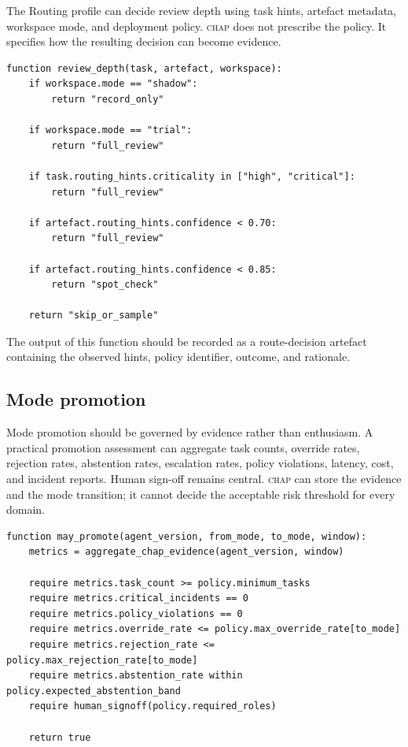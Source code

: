 \documentclass[11pt]{article}
\newcommand{\chap}{\textsc{chap}}
\begin{document}
The Routing profile can decide review depth using task hints, artefact metadata, workspace mode, and deployment policy. \chap{} does not prescribe the policy. It specifies how the resulting decision can become evidence.

\begin{lstlisting}[caption={Example review-depth policy, deployment-specific.},label={lst:reviewdepth}]
function review_depth(task, artefact, workspace):
    if workspace.mode == "shadow":
        return "record_only"

    if workspace.mode == "trial":
        return "full_review"

    if task.routing_hints.criticality in ["high", "critical"]:
        return "full_review"

    if artefact.routing_hints.confidence < 0.70:
        return "full_review"

    if artefact.routing_hints.confidence < 0.85:
        return "spot_check"

    return "skip_or_sample"
\end{lstlisting}

The output of this function should be recorded as a route-decision artefact containing the observed hints, policy identifier, outcome, and rationale.

\subsection{Mode promotion}

Mode promotion should be governed by evidence rather than enthusiasm. A practical promotion assessment can aggregate task counts, override rates, rejection rates, abstention rates, escalation rates, policy violations, latency, cost, and incident reports. Human sign-off remains central. \chap{} can store the evidence and the mode transition; it cannot decide the acceptable risk threshold for every domain.

\begin{lstlisting}[caption={Evidence-based mode promotion logic, informative.},label={lst:promotion}]
function may_promote(agent_version, from_mode, to_mode, window):
    metrics = aggregate_chap_evidence(agent_version, window)

    require metrics.task_count >= policy.minimum_tasks
    require metrics.critical_incidents == 0
    require metrics.policy_violations == 0
    require metrics.override_rate <= policy.max_override_rate[to_mode]
    require metrics.rejection_rate <= policy.max_rejection_rate[to_mode]
    require metrics.abstention_rate within policy.expected_abstention_band
    require human_signoff(policy.required_roles)

    return true
\end{lstlisting}
\end{document}
